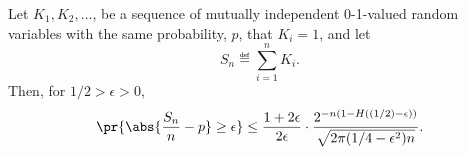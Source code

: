 \iffalse
So, letting $\alpha = (1/2) - \epsilon$, we have
\begin{align*}
\delta & \leq F_{n,1/2}((\frac{1}{2} - \epsilon) n) +
   F_{n,1 - 1/2}((1 -\frac{1}{2}-\epsilon) n)\notag\\
   & = 2 F_{n,1/2}(\alpha n)\notag\\
 & \le 2 \cdot \frac{\beta}{1 - \alpha / (1/2)} \cdot
                \frac{2^{n H(\alpha)}}{\sqrt{2 \pi \alpha \beta  n}} 
                \cdot (1/2)^{\alpha n} (1/2)^{\beta n}
   &\text{(by~\eqref{LN12:1 - H} and~\eqref{LN12:Fbyf})}\notag\\
 & =  2 \cdot \frac{\beta}{1 - 2\alpha} \cdot
                \frac{2^{n H(\alpha)}}{\sqrt{2 \pi \alpha \beta  n}}
                \cdot (1/2)^n\notag\\
 & = 2 \cdot \frac{\beta}{1 - 2\alpha} \cdot
                \frac{2^{-n (1 - H(\alpha))}}{\sqrt{2 \pi \alpha \beta n}}\\
 & = \frac{1 - 2\epsilon}{2\epsilon} \cdot
     \frac{2^{-n (1 - H((1/2) - \epsilon))}}{\sqrt{2 \pi (1/4 - \epsilon^2) n}}.
\end{align*}

To summarize, we have established
\fi
\begin{theorem}\label{LN12:bs}
Let $K_1, K_2, \dots$, be a sequence of mutually independent 0-1-valued
random variables with the same probability, $p$, that $K_i=1$, and let
\[
S_n \eqdef \sum_{i=1}^n K_i.
\]
Then, for $1/2 > \epsilon > 0$,
\begin{equation}\label{LN12:delta bound}
\pr{\abs{\frac{S_n}{n} - p} \geq \epsilon}
\leq 
\frac{1 + 2\epsilon}{2\epsilon} \cdot
        \frac{2^{-n (1 - H((1/2) - \epsilon))}}{\sqrt{2 \pi (1/4 - \epsilon^2) n}}.
\end{equation}

\end{theorem}

